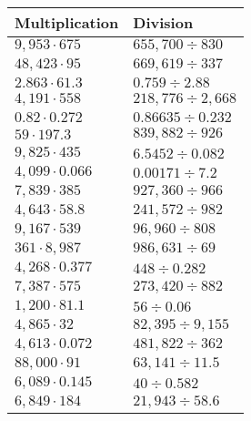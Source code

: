 \begin{longtable}[]{@{}ll@{}}
\toprule
Multiplication & Division\tabularnewline
\midrule
\endhead
\(9,953\cdot675\) & \(655,700÷830\)\tabularnewline
\(48,423\cdot95\) & \(669,619÷337\)\tabularnewline
\(2.863\cdot61.3\) & \(0.759 ÷2.88\)\tabularnewline
\(4,191\cdot558\) & \(218,776÷2,668\)\tabularnewline
\(0.82\cdot0.272\) & \(0.86635÷0.232\)\tabularnewline
\(59\cdot197.3\) & \(839,882÷926\)\tabularnewline
\(9,825\cdot435\) & \(6.5452÷0.082\)\tabularnewline
\(4,099\cdot0.066\) & \(0.00171÷7.2\)\tabularnewline
\(7,839\cdot385\) & \(927,360÷966\)\tabularnewline
\(4,643\cdot58.8\) & \(241,572÷982\)\tabularnewline
\(9,167\cdot539\) & \(96,960÷808\)\tabularnewline
\(361\cdot8,987\) & \(986,631÷69\)\tabularnewline
\(4,268\cdot0.377\) & \(448÷0.282\)\tabularnewline
\(7,387\cdot575\) & \(273,420÷882\)\tabularnewline
\(1,200\cdot81.1\) & \(56÷0.06\)\tabularnewline
\(4,865\cdot32\) & \(82,395÷9,155\)\tabularnewline
\(4,613\cdot0.072\) & \(481,822÷362\)\tabularnewline
\(88,000\cdot91\) & \(63,141÷11.5\)\tabularnewline
\(6,089\cdot0.145\) & \(40÷0.582\)\tabularnewline
\(6,849\cdot184\) & \(21,943÷58.6\)\tabularnewline
\bottomrule
\end{longtable}
